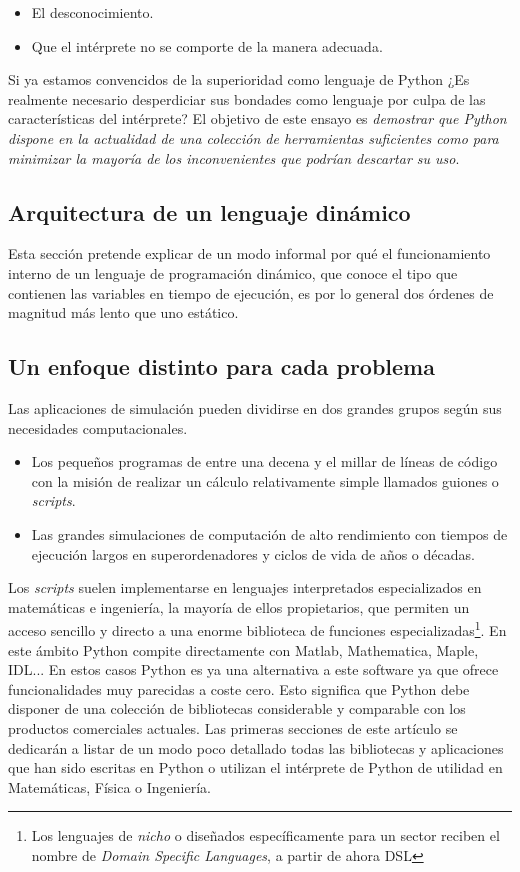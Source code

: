 \documentclass[a4paper,10pt]{article}
\begin{document}
\begin{itemize}
\item El desconocimiento.
\item Que el intérprete no se comporte de la manera adecuada.
\end{itemize}

Si ya estamos convencidos de la superioridad como lenguaje de Python
¿Es realmente necesario desperdiciar sus bondades como lenguaje por
culpa de las características del intérprete?  El objetivo de este
ensayo es \emph{demostrar que Python dispone en la actualidad de una
  colección de herramientas suficientes como para minimizar la mayoría
  de los inconvenientes que podrían descartar su uso}.

\subsection{Arquitectura de un lenguaje dinámico}

Esta sección pretende explicar de un modo informal por qué el
funcionamiento interno de un lenguaje de programación dinámico, que
conoce el tipo que contienen las variables en tiempo de ejecución, es
por lo general dos órdenes de magnitud más lento que uno estático.

\subsection{Un enfoque distinto para cada problema}

Las aplicaciones de simulación pueden dividirse en dos grandes grupos
según sus necesidades computacionales.

\begin{itemize}
\item Los pequeños programas de entre una decena y el millar de líneas
  de código con la misión de realizar un cálculo relativamente simple
  llamados guiones o \emph{scripts}.
\item Las grandes simulaciones de computación de alto rendimiento con
  tiempos de ejecución largos en superordenadores y ciclos de vida de
  años o décadas.
\end{itemize}

Los \emph{scripts} suelen implementarse en lenguajes interpretados
especializados en matemáticas e ingeniería, la mayoría de ellos
propietarios, que permiten un acceso sencillo y directo a una enorme
biblioteca de funciones especializadas\footnote{Los lenguajes de
  \emph{nicho} o diseñados específicamente para un sector reciben el
  nombre de \emph{Domain Specific Languages}, a partir de ahora DSL}.
En este ámbito Python compite directamente con Matlab, Mathematica,
Maple, IDL... En estos casos Python es ya una alternativa a este
software ya que ofrece funcionalidades muy parecidas a coste
cero. Esto significa que Python debe disponer de una colección de
bibliotecas considerable y comparable con los productos comerciales
actuales. Las primeras secciones de este artículo se dedicarán a
listar de un modo poco detallado todas las bibliotecas y aplicaciones
que han sido escritas en Python o utilizan el intérprete de Python de
utilidad en Matemáticas, Física o Ingeniería.
\end{document}
